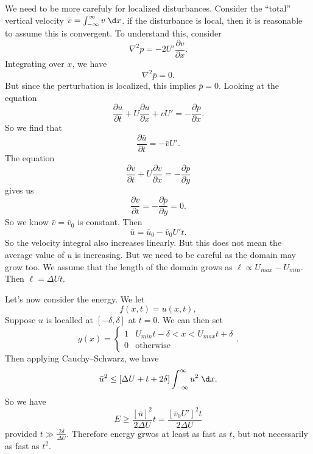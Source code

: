 \documentclass[a4paper]{article}
\begin{document}
We need to be more carefuly for localized disturbances. Consider the ``total'' vertical velocity $\bar{v} = \int_{-\infty}^\infty v\;\d x$. if the disturbance is local, then it is reasonable to assume this is convergent. To understand this, consider
\[
  \nabla^2 p = - 2U' \frac{\partial v}{\partial x}.
\]
Integrating over $x$, we have
\[
  \nabla^2 \bar{p} = 0.
\]
But since the perturbation is localized, this implies $\bar{p} = 0$. Looking at the equation
\[
  \frac{\partial u}{\partial t} + U \frac{\partial u}{\partial x} + v U' = - \frac{\partial p}{\partial x}.
\]
So we find that
\[
  \frac{\partial \bar{u}}{\partial t} = - \bar{v} U'.
\]
The equation
\[
  \frac{\partial v}{\partial t} + U \frac{\partial v}{\partial x} = - \frac{\partial p}{\partial y}
\]
gives us
\[
  \frac{\partial \bar{v}}{\partial t} = - \frac{\partial \bar{p}}{\partial y} = 0.
\]
So we know $\bar{v} = \bar{v}_0$ is constant. Then
\[
  \bar{u} = \bar{u}_0 - \bar{v}_0 U' t.
\]
So the velocity integral also increases linearly. But this does not mean the average value of $u$ is increasing. But we need to be careful as the domain may grow too. We assume that the length of the domain grows as $\dot{\ell} \propto U_{max} - U_{min}$. Then $\ell = \Delta U t$.

Let's now consider the energy. We let
\[
  f(x, t) = u(x, t),
\]
Suppose $u$ is localled at $[-\delta, \delta]$ at $t = 0$. We can then set
\[
  g(x) =
  \begin{cases}
    1 & U_{min} t - \delta < x < U_{max} t + \delta\\
    0 & \text{otherwise}
  \end{cases}.
\]
Then applying Cauchy--Schwarz, we have
\[
  \bar{u}^2 \leq [\Delta U + t + 2\delta] \int_{-\infty}^\infty u^2 \;\d x.
\]
So we have
\[
  E \geq \frac{[\bar{u}]^2}{2 \Delta U}t = \frac{[\bar{v}_0 U']^2 t}{2 \Delta U}
\]
provided $t \gg \frac{2\delta}{\Delta U}$. Therefore energy grwos at least as fast as $t$, but not necessarily as fast as $t^2$.
\end{document}
